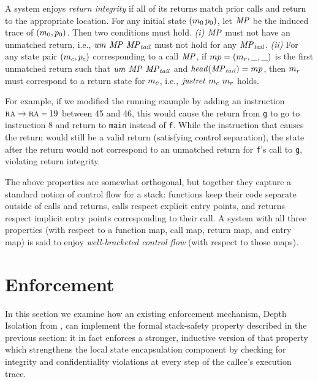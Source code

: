 \documentclass[acmsmall,review,anonymous]{acmart}\settopmatter{printfolios=true,printccs=false,printacmref=false}
\begin{document}
{%
A system enjoys {\em return integrity} if all of its returns match prior calls
and return to the appropriate location. For any initial state \((m_0\, p_0)\), let
\(\mathit{MP}\) be the induced trace of \((m_0,p_0)\). Then two
conditions must hold.
\emph{(i)} \(\mathit{MP}\) must not have an unmatched return, i.e., \(\mathit{um} ~ \mathit{MP} ~ \mathit{MP}_{\mathit{tail}}\)
must not hold for any \(\mathit{MP}_{\mathit{tail}}\). \emph{(ii)} For any state pair \((m_c, p_c)\)
corresponding to a call \(\mathit{MP}\), if
\(mp = (m_r,\_,\_)\)
is the first unmatched return such that
\( \mathit{um} ~ \mathit{MP} ~ \mathit{MP}_{\mathit{tail}}\) and \(\mathit{head}{(\mathit{MP}_{\mathit{tail}})} = mp\),
then $m_r$ must correspond to a return state for $m_c$, i.e.,
\(\mathit{justret}\ m_c\ m_r\) holds.

For example, if we modified the running example by adding
an instruction $ \textsc{ra} \rightarrow \textsc{ra} - 19$
between 45 and 46, this would cause the return from {\tt g} to go to instruction 8 and
return to {\tt main} instead of {\tt f}. While the instruction that
causes the return would still be a valid return (satisfying control
separation), the state after the return would not correspond to an
unmatched return for {\tt f}'s call to {\tt g}, violating return
integrity.

The above properties are somewhat orthogonal, but together they
capture a standard notion of control flow for a stack: functions keep
their code separate outside of calls and returns, calls respect
explicit entry points, and returns respect implicit entry points
corresponding to their call.  A system with all three
properties (with respect to a function map, call map, return map,
and entry map) is said to enjoy
{\em well-bracketed control flow} (with respect to those maps).


\section{Enforcement}
\label{sec:enforcement}

In this section we examine how an existing enforcement mechanism,
Depth Isolation from \citet{DBLP:conf/sp/RoesslerD18}, can implement
the formal stack-safety property described in the previous section: it in
fact enforces a stronger, inductive version of that property which strengthens the
local state encapsulation component by checking for integrity and
confidentiality violations at every step of the callee's execution trace.

}
\end{document}
